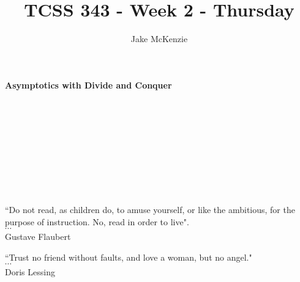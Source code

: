 \documentclass[12pt]{article}
\begin{document}
\title{TCSS 343 - Week 2 - Thursday}
\author{Jake McKenzie}
\maketitle
\noindent\centerline{\textbf{Asymptotics with Divide and Conquer}}\\\\\\\\\\\\\\\\
\begin{center}
    ``Do not read, as children do, to amuse yourself, or like the ambitious, for the purpose of instruction. No, read in order to live". \\$\cdots$\\ Gustave Flaubert
\end{center}
\begin{center}
    ``Trust no friend without faults, and love a woman, but no angel."\\
    $\cdots$\\
    Doris Lessing
\end{center}
\newpage
\end{document}

